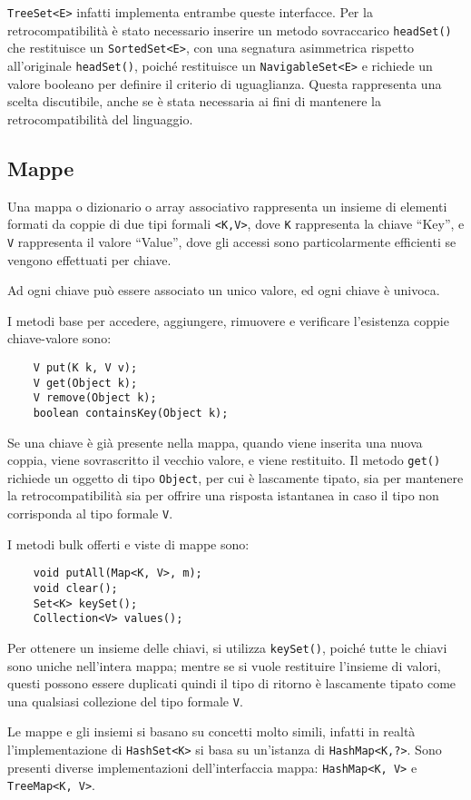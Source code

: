 \documentclass{article}
\numberwithin{equation}{subsection}
\begin{document}
\verb|TreeSet<E>| infatti implementa entrambe queste interfacce. 
Per la retrocompatibilità è stato necessario inserire un metodo sovraccarico \verb|headSet()| che restituisce 
un \verb|SortedSet<E>|, con una segnatura asimmetrica rispetto all'originale \verb|headSet()|, poiché restituisce un \verb|NavigableSet<E>| e richiede un valore booleano per 
definire il criterio di uguaglianza. Questa rappresenta una scelta discutibile, anche se è stata necessaria ai fini di mantenere la retrocompatibilità del linguaggio. 

\subsection{Mappe}

Una mappa o dizionario o array associativo rappresenta un insieme di elementi formati da coppie di due tipi formali \verb|<K,V>|, dove \verb|K| rappresenta la chiave ``Key'', 
e \verb|V| rappresenta il valore ``Value'', dove gli accessi sono particolarmente efficienti se vengono effettuati per chiave. 

Ad ogni chiave può essere associato un unico valore, ed ogni chiave è univoca. 

I metodi base per accedere, aggiungere, rimuovere e verificare l'esistenza coppie chiave-valore sono:
\begin{verbatim}
    V put(K k, V v);
    V get(Object k);
    V remove(Object k);
    boolean containsKey(Object k);
\end{verbatim}
Se una chiave è già presente nella mappa, quando viene inserita una nuova coppia, viene sovrascritto il vecchio valore, e viene restituito. 
Il metodo \verb|get()| richiede un oggetto di tipo \verb|Object|, per cui è lascamente tipato, sia per mantenere la retrocompatibilità sia per offrire una risposta istantanea 
in caso il tipo non corrisponda al tipo formale \verb|V|. 

I metodi bulk offerti e viste di mappe sono:
\begin{verbatim}
    void putAll(Map<K, V>, m);
    void clear();
    Set<K> keySet();
    Collection<V> values();
\end{verbatim}
Per ottenere un insieme delle chiavi, si utilizza 
\verb|keySet()|, poiché tutte le chiavi sono uniche nell'intera mappa; mentre se si vuole restituire l'insieme di valori, questi possono essere duplicati quindi il tipo 
di ritorno è lascamente tipato come una qualsiasi collezione del tipo formale \verb|V|. 

Le mappe e gli insiemi si basano su concetti molto simili, infatti in realtà l'implementazione di \verb|HashSet<K>| si basa su un'istanza di \verb|HashMap<K,?>|. 
Sono presenti diverse implementazioni dell'interfaccia mappa: \verb|HashMap<K, V>| e \verb|TreeMap<K, V>|. 
\end{document}
